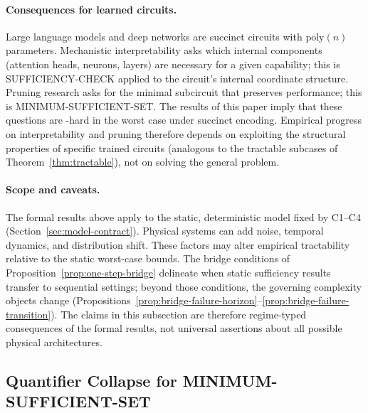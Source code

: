 \paragraph{Consequences for learned circuits.}
Large language models and deep networks are succinct circuits with $\mathrm{poly}(n)$ parameters.
Mechanistic interpretability asks which internal components (attention heads, neurons, layers) are necessary for a given capability; this is SUFFICIENCY-CHECK applied to the circuit's internal coordinate structure.
Pruning research asks for the minimal subcircuit that preserves performance; this is MINIMUM-SUFFICIENT-SET.
The results of this paper imply that these questions are \coNP-hard in the worst case under succinct encoding.
Empirical progress on interpretability and pruning therefore depends on exploiting the structural properties of specific trained circuits (analogous to the tractable subcases of Theorem~\ref{thm:tractable}), not on solving the general problem.

\paragraph{Scope and caveats.}
The formal results above apply to the static, deterministic model fixed by C1--C4 (Section~\ref{sec:model-contract}). Physical systems can add noise, temporal dynamics, and distribution shift. These factors may alter empirical tractability relative to the static worst-case bounds. The bridge conditions of Proposition~\ref{prop:one-step-bridge} delineate when static sufficiency results transfer to sequential settings; beyond those conditions, the governing complexity objects change (Propositions~\ref{prop:bridge-failure-horizon}--\ref{prop:bridge-failure-transition}). The claims in this subsection are therefore regime-typed consequences of the formal results, not universal assertions about all possible physical architectures.

\subsection{Quantifier Collapse for MINIMUM-SUFFICIENT-SET}

